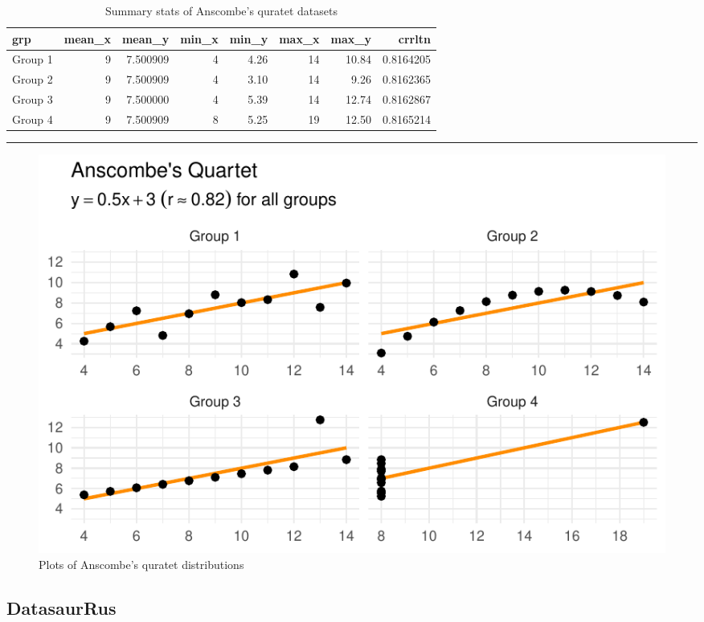 \documentclass[
  letterpaper,
  DIV=11]{scrartcl}
\begin{document}
\hypertarget{tbl-anscombe}{}
\begin{table}
\caption{\label{tbl-anscombe}Summary stats of Anscombe's quratet datasets }\tabularnewline

\centering\begingroup\fontsize{20}{22}\selectfont

\begin{tabular}{l|r|r|r|r|r|r|r}
\hline
grp & mean\_x & mean\_y & min\_x & min\_y & max\_x & max\_y & crrltn\\
\hline
Group 1 & 9 & 7.500909 & 4 & 4.26 & 14 & 10.84 & 0.8164205\\
\hline
Group 2 & 9 & 7.500909 & 4 & 3.10 & 14 & 9.26 & 0.8162365\\
\hline
Group 3 & 9 & 7.500000 & 4 & 5.39 & 14 & 12.74 & 0.8162867\\
\hline
Group 4 & 9 & 7.500909 & 8 & 5.25 & 19 & 12.50 & 0.8165214\\
\hline
\end{tabular}
\endgroup{}
\end{table}

\begin{center}\rule{0.5\linewidth}{0.5pt}\end{center}

\begin{figure}

{\centering \includegraphics{_descr_stats_EN_files/figure-pdf/fig-anscombe-1.pdf}

}

\caption{\label{fig-anscombe}Plots of Anscombe's quratet distributions}

\end{figure}

\hypertarget{datasaurrus}{%
\subsection{DatasaurRus}\label{datasaurrus}}
\end{document}
